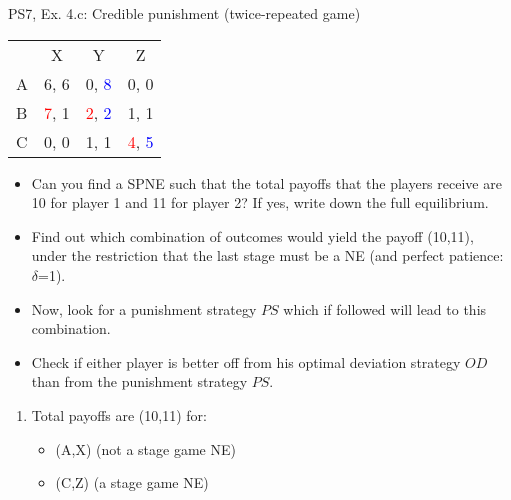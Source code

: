 \begin{frame}{PS7, Ex. 4.c: Credible punishment (twice-repeated game)}
    \vspace{-2pt}
    \begin{table}
      \begin{tabular}{l|c|c|c|}
        \multicolumn{1}{c}{} & \multicolumn{1}{c}{X} & \multicolumn{1}{c}{Y} & \multicolumn{1}{c}{Z}\\\cline{2-4}
        A   & 6, 6 &  0, \textcolor{blue}{8} &  0, 0  \\\cline{2-4}
        B & \textcolor{red}{7}, 1  & \textcolor{red}{2}, \textcolor{blue}{2} &  1, 1  \\\cline{2-4}
        C & 0, 0  & 1, 1 &  \textcolor{red}{4}, \textcolor{blue}{5}  \\\cline{2-4}
      \end{tabular}
    \end{table}
    \vspace{-4pt}
    \begin{itemize}
        \item[(c)] Can you find a SPNE such that the total payoffs that the players receive are 10 for player 1 and 11 for player 2? If yes, write down the full equilibrium.
    \end{itemize}
    \vspace{-8pt}
    \begin{multicols}{2}
      \begin{itemize}
        \item[(Step a)] Find out which combination of outcomes would yield the payoff (10,11), under the restriction that the last stage must be a NE (and perfect patience: $\delta$=1).
        \item[(Step b)] Now, look for a punishment strategy $PS$ which if followed will lead to this combination.
        \item[(Step c)] Check if either player is better off from his optimal deviation strategy $OD$ than from the punishment strategy $PS$.
      \end{itemize}
      \vspace{-6pt}
      \vfill\null\columnbreak
      \begin{enumerate}
        \item[a] Total payoffs are (10,11) for:
        \begin{itemize}\normalsize
          \item[t=1:] (A,X) (not a stage game NE)
          \item[t=2:] (C,Z) (a stage game NE)

\end{itemize}
\end{enumerate}
\end{multicols}
\end{frame}

